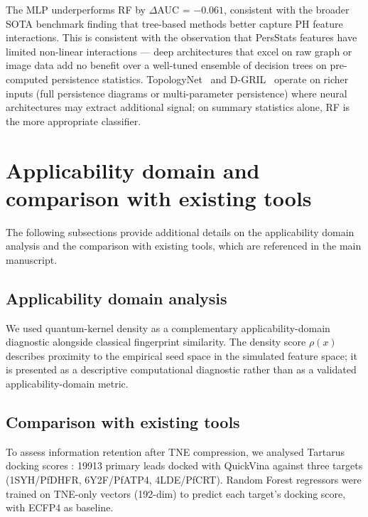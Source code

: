 \documentclass[11pt,a4paper]{article}
\begin{document}
The MLP underperforms RF by $\Delta$AUC = $-0.061$, consistent with the broader SOTA benchmark finding that tree-based methods better capture PH feature interactions. This is consistent with the observation that PersStats features have limited non-linear interactions --- deep architectures that excel on raw graph or image data add no benefit over a well-tuned ensemble of decision trees on pre-computed persistence statistics. TopologyNet~\citep{topologynet_2018} and D-GRIL~\citep{dgril_2026} operate on richer inputs (full persistence diagrams or multi-parameter persistence) where neural architectures may extract additional signal; on summary statistics alone, RF is the more appropriate classifier.

\vspace{4mm}


\section{Applicability domain and comparison with existing tools}
\label{sec:applicability_comparison}

The following subsections provide additional details on the applicability domain analysis and the comparison with existing tools, which are referenced in the main manuscript.

\subsection{Applicability domain analysis}
\label{SM-sec:applicability_domain}

We used quantum-kernel density as a complementary applicability-domain diagnostic alongside classical fingerprint similarity. The density score $\rho(x)$ describes proximity to the empirical seed space in the simulated feature space; it is presented as a descriptive computational diagnostic rather than as a validated applicability-domain metric.


\subsection{Comparison with existing tools}


To assess information retention after TNE compression, we analysed Tartarus docking scores \citep{tartarus_2024}: \num{19913} primary leads docked with QuickVina against three targets (1SYH/PfDHFR, 6Y2F/PfATP4, 4LDE/PfCRT). Random Forest regressors were trained on TNE-only vectors (\num{192}-dim) to predict each target's docking score, with ECFP4 as baseline.
\end{document}
